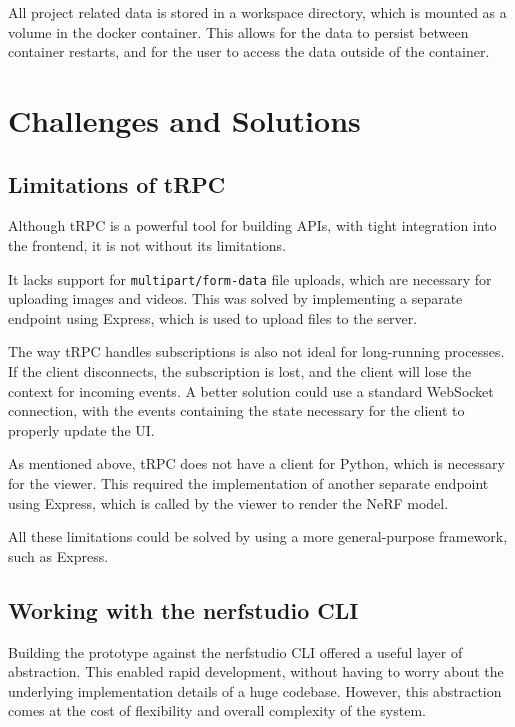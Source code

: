 All project related data is stored in a workspace directory, which is mounted as a volume in the docker container.
This allows for the data to persist between container restarts, and for the user to access the data outside of the container.

\section{Challenges and Solutions}
\label{sec:system:challenges}

\subsection*{Limitations of tRPC}

Although tRPC is a powerful tool for building APIs, with tight integration into the frontend, it is not without its limitations.

It lacks support for \texttt{multipart/form-data} file uploads, which are necessary for uploading images and videos.
This was solved by implementing a separate endpoint using Express, which is used to upload files to the server.

The way tRPC handles subscriptions is also not ideal for long-running processes.
If the client disconnects, the subscription is lost, and the client will lose the context for incoming events.
A better solution could use a standard WebSocket connection, with the events containing the state necessary for the client to properly update the UI.

As mentioned above, tRPC does not have a client for Python, which is necessary for the viewer.
This required the implementation of another separate endpoint using Express, which is called by the viewer to render the NeRF model.

All these limitations could be solved by using a more general-purpose framework, such as Express.

\subsection*{Working with the nerfstudio CLI}

Building the prototype against the nerfstudio CLI offered a useful layer of abstraction.
This enabled rapid development, without having to worry about the underlying implementation details of a huge codebase.
However, this abstraction comes at the cost of flexibility and overall complexity of the system.

